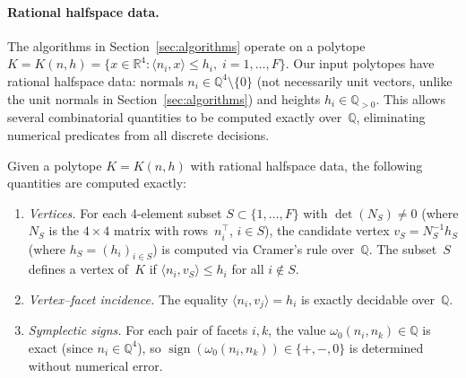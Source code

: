 
\paragraph{Rational halfspace data.}
The algorithms in Section~\ref{sec:algorithms} operate on a polytope
$K = K(n, h) = \{x \in \mathbb{R}^4 : \langle n_i, x \rangle \leq h_i,
\; i = 1, \ldots, F\}$.
Our input polytopes have rational halfspace data:
normals $n_i \in \mathbb{Q}^4 \setminus \{0\}$
(not necessarily unit vectors, unlike the unit normals
in Section~\ref{sec:algorithms})
and heights $h_i \in \mathbb{Q}_{>0}$.
This allows several combinatorial quantities to be
computed exactly over~$\mathbb{Q}$, eliminating
numerical predicates from all discrete decisions.


\begin{remark}%
\label{rem:exact-quantities}
Given a polytope $K = K(n, h)$ with rational halfspace data,
the following quantities are computed exactly:
\begin{enumerate}
\item \emph{Vertices.}
  For each 4-element subset $S \subset \{1, \ldots, F\}$
  with $\det(N_S) \neq 0$ (where $N_S$ is the $4 \times 4$
  matrix with rows~$n_i^\top$, $i \in S$),
  the candidate vertex $v_S = N_S^{-1} h_S$
  (where $h_S = (h_i)_{i \in S}$) is computed
  via Cramer's rule over~$\mathbb{Q}$.
  The subset~$S$ defines a vertex of~$K$ if
  $\langle n_i, v_S \rangle \leq h_i$ for all $i \notin S$.
\item \emph{Vertex--facet incidence.}
  The equality $\langle n_i, v_j \rangle = h_i$
  is exactly decidable over~$\mathbb{Q}$.
\item \emph{Symplectic signs.}
  For each pair of facets $i, k$,
  the value $\omega_0(n_i, n_k) \in \mathbb{Q}$
  is exact (since $n_i \in \mathbb{Q}^4$),
  so $\operatorname{sign}(\omega_0(n_i, n_k))
  \in \{+, -, 0\}$ is determined without
  numerical error.
\end{enumerate}
\end{remark}


